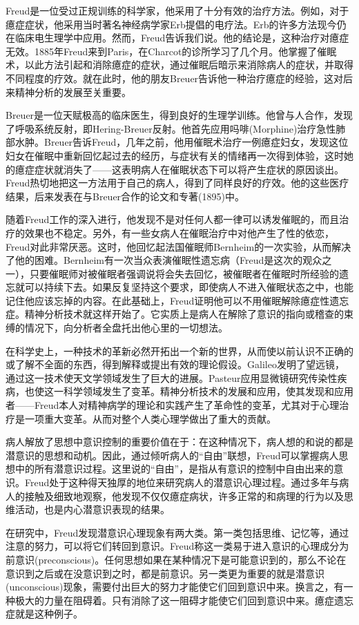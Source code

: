 \documentclass[UTF8,10pt,a4paper,openany]{book}
\begin{document}
Freud是一位受过正规训练的科学家，他采用了十分有效的治疗方法。例如，对于癔症症状，他采用当时著名神经病学家Erb提倡的电疗法。Erb的许多方法现今仍在临床电生理学中应用。然而，Freud告诉我们说。他的结论是，这种治疗对癔症无效。1885年Freud来到Paris，在Charcot的诊所学习了几个月。他掌握了催眠术，以此方法引起和消除癔症的症状，通过催眠后暗示来消除病人的症状，并取得不同程度的疗效。就在此时，他的朋友Breuer告诉他一种治疗癔症的经验，这对后来精神分析的发展至关重要。

Breuer是一位天赋极高的临床医生，得到良好的生理学训练。他曾与人合作，发现了呼吸系统反射，即Hering-Breuer反射。他首先应用吗啡(Morphine)治疗急性肺部水肿。Breuer告诉Freud，几年之前，他用催眠术治疗一例癔症妇女，发现这位妇女在催眠中重新回忆起过去的经历，与症状有关的情绪再一次得到体验，这时她的癔症症状就消失了——这表明病人在催眠状态下可以将产生症状的原因谈出。Freud热切地把这一方法用于自己的病人，得到了同样良好的疗效。他的这些医疗结果，后来发表在与Breuer合作的论文和专著(1895)中。

随着Freud工作的深入进行，他发现不是对任何人都一律可以诱发催眠的，而且治疗的效果也不稳定。另外，有一些女病人在催眠治疗中对他产生了性的依恋，Freud对此非常厌恶。这时，他回忆起法国催眠师Bernheim的一次实验，从而解决了他的困难。Bernheim有一次当众表演催眠性遗忘病（Freud是这次的观众之一），只要催眠师对被催眠者强调说将会失去回忆，被催眠者在催眠时所经验的遗忘就可以持续下去。如果反复坚持这个要求，即使病人不进入催眠状态之中，也能记住他应该忘掉的内容。在此基础上，Freud证明他可以不用催眠解除癔症性遗忘症。精神分析技术就这样开始了。它实质上是病人在解除了意识的指向或稽查的束缚的情况下，向分析者全盘托出他心里的一切想法。

在科学史上，一种技术的革新必然开拓出一个新的世界，从而使以前认识不正确的或了解不全面的东西，得到解释或提出有效的理论假设。Galileo发明了望远镜，通过这一技术使天文学领域发生了巨大的进展。Pasteur应用显微镜研究传染性疾病，也使这一科学领域发生了变革。精神分析技术的发展和应用，使其发现和应用者——Freud本人对精神病学的理论和实践产生了革命性的变革，尤其对于心理治疗是一项重大变革。从而对整个人类心理学做出了重大的贡献。

病人解放了思想中意识控制的重要价值在于：在这种情况下，病人想的和说的都是潜意识的思想和动机。因此，通过倾听病人的“自由”联想，Freud可以掌握病人思想中的所有潜意识过程。这里说的“自由”，是指从有意识的控制中自由出来的意识。Freud处于这种得天独厚的地位来研究病人的潜意识心理过程。通过多年与病人的接触及细致地观察，他发现不仅仅癔症病状，许多正常的和病理的行为以及思维活动，也是内心潜意识表现的结果。

在研究中，Freud发现潜意识心理现象有两大类。第一类包括思维、记忆等，通过注意的努力，可以将它们转回到意识。Freud称这一类易于进入意识的心理成分为前意识(preconscious)。任何思想如果在某种情况下是可能意识到的，那么不论在意识到之后或在没意识到之时，都是前意识。另一类更为重要的就是潜意识(unconscious)现象，需要付出巨大的努力才能使它们回到意识中来。换言之，有一种极大的力量在阻碍着。只有消除了这一阻碍才能使它们回到意识中来。癔症遗忘症就是这种例子。
\end{document}
